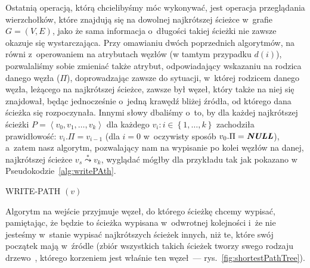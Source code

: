 Ostatnią operacją, którą chcielibyśmy móc wykonywać, jest operacja przeglądania wierzchołków, które znajdują się na dowolnej najkrótszej ścieżce w~grafie $G = \left( V, E \right)$, jako że sama informacja o~długości takiej ścieżki nie zawsze okazuje się wystarczająca.
Przy omawianiu dwóch poprzednich algorytmów, na równi z~operowaniem na atrybutach węzłów (w tamtym przypadku $d \left( i \right)$), pozwalaliśmy sobie zmieniać także atrybut, odpowiadający wskazaniu na rodzica danego węzła ($\Pi$), doprowadzając zawsze do sytuacji, w~której rodzicem danego węzła, leżącego na najkrótszej ścieżce, zawsze był węzeł, który także na niej się znajdował, będąc jednocześnie o~jedną krawędź bliżej źródła, od którego dana ścieżka się rozpoczynała.
Innymi słowy dbaliśmy o~to, by dla każdej najkrótszej ścieżki $P = \left \langle v_{0}, v_{1}, \dots, v_{k} \right \rangle$ dla każdego $v_{i} : i \in \left\{ 1, \dots, k \right\}$ zachodziła prawidłowość: $v_{i}.\Pi = v_{i-1}$ (dla $i = 0$ w~oczywisty sposób $v_{0}.\Pi = \emph{\textbf{NULL}}$), a~zatem nasz algorytm, pozwalający nam na wypisanie po kolei węzłów na danej, najkrótszej ścieżce $v_{s} \overset{*} \leadsto v_{k}$, wyglądać mógłby dla przykładu tak jak pokazano w Pseudokodzie~\ref{alg:writePAth}.

\begin{pseudokod}[!htbp]
	\DontPrintSemicolon
	\caption{
		WRITE-PATH $\left( v \right)$
	}
	\label{alg:writePAth}
\end{pseudokod}

Algorytm na wejście przyjmuje węzeł, do którego ścieżkę chcemy wypisać, pamiętając, że będzie to ścieżka wypisana w~odwrotnej kolejności i~że nie jesteśmy w~stanie wypisać najkrótszych ścieżek innych, niż te, które swój początek mają w~źródle (zbiór wszystkich takich ścieżek tworzy swego rodzaju drzewo~\cite[$24.5$]{Cormen}, którego korzeniem jest właśnie ten węzeł~--- rys.~\ref{fig:shortestPathTree}).

